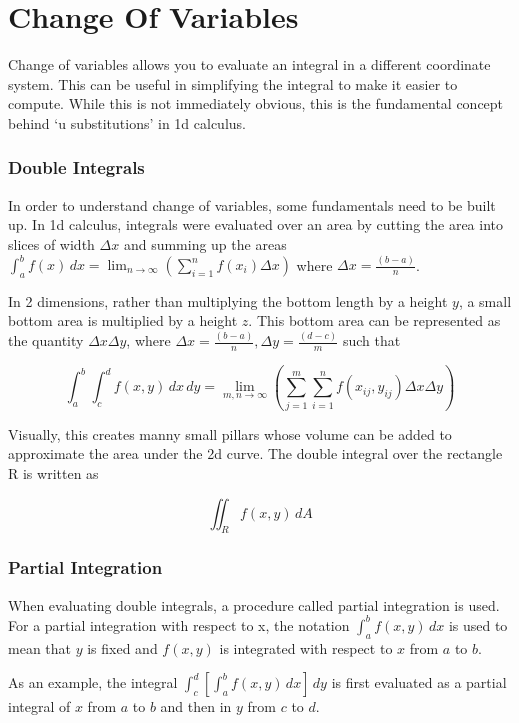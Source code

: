 \documentclass{notes}
\begin{document}
\section*{Change Of Variables}

Change of variables allows you to evaluate an integral in a different coordinate system. This can be useful in simplifying the integral to make it easier to compute. While this is not immediately obvious, this is the fundamental concept behind `u substitutions' in 1d calculus.

\subsubsection*{Double Integrals}

In order to understand change of variables, some fundamentals need to be built up. In 1d calculus, integrals were evaluated over an area by cutting the area into slices of width \(\Delta x\) and summing up the areas \(\int_{a}^{b} f(x)\,dx = \lim_{n \to \infty} (\sum_{i=1}^{n}f(x_i)\Delta x)\) where \(\Delta x = \frac{(b-a)}{n}\).

In 2 dimensions, rather than multiplying the bottom length by a height \(y\), a small bottom area is multiplied by a height \(z\). This bottom area can be represented as the quantity \(\Delta x \Delta y\), where \(\Delta x = \frac{(b-a)}{n}, \Delta y = \frac{(d-c)}{m}\) such that

\[\int_{a}^{b} \int_{c}^{d} f(x, y)\, dx\, dy = \lim_{m, n \to \infty} (\sum_{j = 1}^{m}\sum_{i = 1}^{n}f(x_{ij}, y_{ij})\Delta x \Delta y)\]

Visually, this creates manny small pillars whose volume can be added to approximate the area under the 2d curve. The double integral over the rectangle R is written as 

\[\iint_{R}f(x, y)\,dA\]

\subsubsection*{Partial Integration}

When evaluating double integrals, a procedure called partial integration is used. For a partial integration with respect to x, the notation \(\int_{a}^{b}f(x, y)\, dx\) is used to mean that \(y\) is fixed and \(f(x, y)\) is integrated with respect to \(x\) from \(a\) to \(b\).

As an example, the integral \(\int_{c}^{d}[\int_{a}^{b}f(x, y)\, dx]\,dy\) is first evaluated as a partial integral of \(x\) from \(a\) to \(b\) and then in \(y\) from \(c\) to \(d\).
\end{document}
